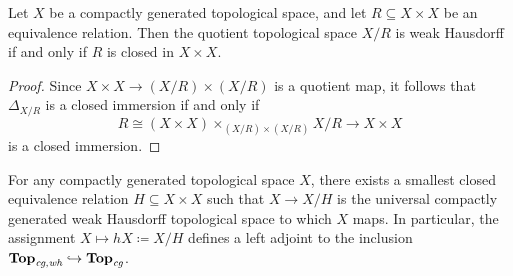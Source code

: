 \begin{lem}
	Let $ X $ be a compactly generated topological space, and let $ R \subseteq X \times X $ be an equivalence relation.
	Then the quotient topological space $ X/R $ is weak Hausdorff if and only if $ R $ is closed in $ X \times X $.
\end{lem}

\begin{proof}
	Since $ X \times X \to (X/R) \times (X/R) $ is a quotient map, it follows that $ \Delta_{X/R} $ is a closed immersion if and only if
	\[
		R \cong (X \times X) \times_{(X/R) \times (X/R)} X/R \to X \times X
	\]
	is a closed immersion.
\end{proof}

\begin{cor}
	For any compactly generated topological space $ X $, there exists a smallest closed equivalence relation $ H \subseteq X \times X $ such that $ X \to X/H $ is the universal compactly generated weak Hausdorff topological space to which $ X $ maps.
	In particular, the assignment $ X \mapsto hX \coloneq X/H $ defines a left adjoint to the inclusion $ \textbf{\textup{Top}}_{\textit{cg},\textit{wh}} \hookrightarrow \textbf{\textup{Top}}_{\textit{cg}} $.
\end{cor}





